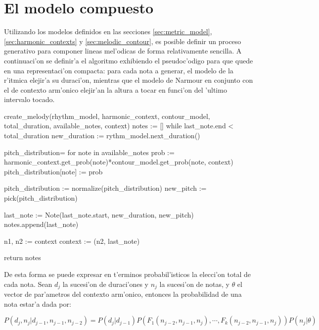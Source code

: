 \section{El modelo compuesto}
Utilizando los modelos definidos en las secciones \ref{sec:metric_model}, \ref{sec:harmonic_contexts} y \ref{sec:melodic_contour}, es posible definir
un proceso generativo para componer lineas mel'odicas de forma relativamente sencilla. 
A continuaci'on se definir'a el algoritmo exhibiendo el pseudoc'odigo para que quede en una representaci'on compacta: 
para cada nota a generar, el modelo de la r'itmica elejir'a su duraci'on, mientras que el modelo de Narmour en conjunto con el de contexto arm'onico 
elejir'an la altura a tocar en funci'on del 'ultimo intervalo tocado.

\begin{algoritmo}
create_melody(rhythm_model, harmonic_context, contour_model, 
              total_duration, available_notes, context)
    notes := []
    while last_note.end < total_duration
        new_duration := rythm_model.next_duration()

        pitch_distribution= {}
        for note in available_notes
            prob := harmonic_context.get_prob(note)*contour_model.get_prob(note, context)
            pitch_distribution[note] := prob 

        pitch_distribution := normalize(pitch_distribution)
        new_pitch := pick(pitch_distribution)

        last_note := Note(last_note.start, new_duration, new_pitch)
        notes.append(last_note) 

        n1, n2 := context
        context := (n2, last_note)

    return notes
\end{algoritmo}

De esta forma se puede expresar en t'erminos probabil'isticos la elecci'on total de cada nota. Sean $d_j$ la sucesi'on de duraci'ones y $n_j$ 
la sucesi'on de notas, y $\theta$ el vector de par'ametros del contexto arm'onico, entonces la probabilidad de una nota estar'a dada por:

$$P(d_j, n_j | d_{j-1}, n_{j-1}, n_{j-2}) = P(d_j|d_{j-1})P(F_1(n_{j-2}, n_{j-1}, n_j), \cdots, F_k(n_{j-2}, n_{j-1}, n_j)) P(n_j | \theta)$$

